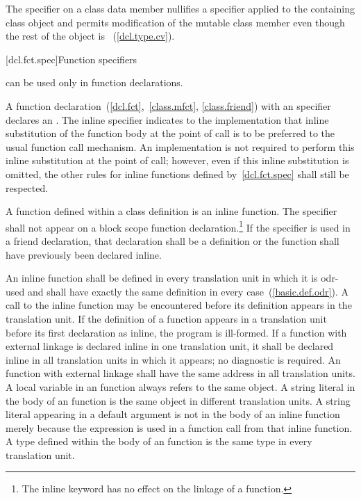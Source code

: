 \pnum
The  specifier on a class data member nullifies a
 specifier applied to the containing class object and
permits modification of the mutable class member even though the rest of
the object is ~(\ref{dcl.type.cv}).

[dcl.fct.spec]{Function specifiers}%
%

\pnum
{}
can be used only in function declarations.

\begin{bnf}
\br
    \br
    \br
\end{bnf}

\pnum
{}%
%
A function declaration~(\ref{dcl.fct},~\ref{class.mfct},
\ref{class.friend}) with an  specifier declares an
. The inline specifier indicates to
the implementation that inline substitution of the function body at the
point of call is to be preferred to the usual function call mechanism.
An implementation is not required to perform this inline substitution at
the point of call; however, even if this inline substitution is omitted,
the other rules for inline functions defined by~\ref{dcl.fct.spec} shall
still be respected.

\pnum
A function defined within a class definition is an inline function. The
 specifier shall not appear on a block scope function
declaration.\footnote{The inline keyword has no effect on the linkage of a function.}
If the  specifier is used in a friend declaration, that
declaration shall be a definition or the function shall have previously
been declared inline.

\pnum
An inline function shall be defined in every translation unit in which
it is odr-used and shall have exactly the same definition in every
case~(\ref{basic.def.odr}).
\enternote
A call to the inline function may be encountered before its definition
appears in the translation unit.
\exitnote
If the definition of a function appears in a translation unit before its
first declaration as inline, the program is ill-formed. If a function
with external linkage is declared inline in one translation unit, it
shall be declared inline in all translation units in which it appears;
no diagnostic is required. An  function with external
linkage shall have the same address in all translation units. A
 local variable in an  
function always refers to the same object. A string literal in the body
of an   function is the same object in
different translation units.
\enternote
A string literal appearing in a default argument is not in
the body of an inline function merely because the expression is used in
a function call from that inline function.
\exitnote
A type defined within the body of an  function is the
same type in every translation unit.

